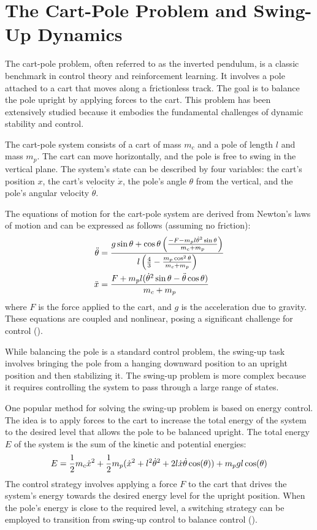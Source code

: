 \section{The Cart-Pole Problem and Swing-Up Dynamics}
The cart-pole problem, often referred to as the inverted pendulum, is a classic benchmark in control theory and reinforcement learning. It involves a pole attached to a cart that moves along a frictionless track. The goal is to balance the pole upright by applying forces to the cart. This problem has been extensively studied because it embodies the fundamental challenges of dynamic stability and control.

The cart-pole system consists of a cart of mass $m_c$ and a pole of length $l$ and mass $m_p$. The cart can move horizontally, and the pole is free to swing in the vertical plane. The system's state can be described by four variables: the cart's position $x$, the cart's velocity $\dot{x}$, the pole's angle $\theta$ from the vertical, and the pole's angular velocity $\dot{\theta}$.

The equations of motion for the cart-pole system are derived from Newton's laws of motion and can be expressed as follows (assuming no friction):
\begin{align}
\ddot{\theta} &= \frac{g\sin\theta + \cos\theta\left(\frac{-F-m_p l \dot{\theta}^2 \sin\theta}{m_c+m_p}\right)}{l\left(\frac{4}{3}-\frac{m_p \cos^2 \theta}{m_c+m_p}\right)} \notag \\
\ddot{x} &= \frac{F+m_p l (\dot{\theta}^2 \sin\theta - \ddot{\theta} \cos\theta)}{m_c+m_p} \notag
\end{align}
where $F$ is the force applied to the cart, and $g$ is the acceleration due to gravity. These equations are coupled and nonlinear, posing a significant challenge for control (\cite{florian_correct_2007}).

While balancing the pole is a standard control problem, the swing-up task involves bringing the pole from a hanging downward position to an upright position and then stabilizing it. The swing-up problem is more complex because it requires controlling the system to pass through a large range of states.

One popular method for solving the swing-up problem is based on energy control. The idea is to apply forces to the cart to increase the total energy of the system to the desired level that allows the pole to be balanced upright. The total energy $E$ of the system is the sum of the kinetic and potential energies:
\begin{align}
E = \frac{1}{2} m_c \dot{x}^2 + \frac{1}{2} m_p (\dot{x}^2 + l^2 \dot{\theta}^2 + 2 l \dot{x} \dot{\theta} \cos(\theta)) + m_p g l \cos(\theta) \notag
\end{align}
The control strategy involves applying a force $F$ to the cart that drives the system's energy towards the desired energy level for the upright position. When the pole's energy is close to the required level, a switching strategy can be employed to transition from swing-up control to balance control (\cite{astrom_swinging_2000}).

